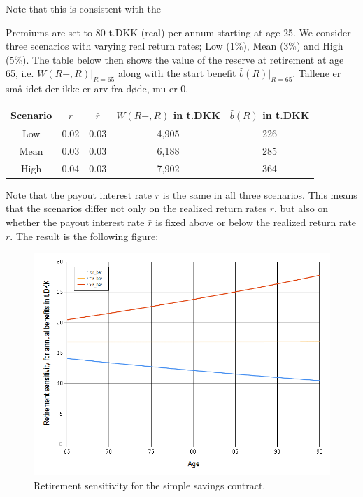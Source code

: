 \documentclass{article}
\newcommand{\1}[1]{\mathbbm{1}_{\left\lbrace #1 \right\rbrace}}
\theoremstyle{break}
\theoremstyle{remark}
\numberwithin{equation}{section}
\begin{document}
Note that this is consistent with the 

\begin{example}
Premiums are set to 80 t.DKK (real) per annum starting at age 25. We consider three scenarios with varying real return rates; Low (1\%), Mean (3\%) and High (5\%). The table below then shows the value of the reserve at retirement at age 65, i.e. $W(R-,R)|_{R=65}$ along with the start benefit $\hat{b}(R)|_{R=65}$. Tallene er små idet der ikke er arv fra døde, mu er 0.

\begin{center}
	\begin{tabular}{ |c|c|c|c|c| }
		\hline
		Scenario & $r$ & $\bar{r}$ & $W(R-,R)$ in t.DKK & $\hat{b}(R)$ in t.DKK \\
		\hline
		Low & 0.02 & 0.03 & 4,905 & 226 \\
		Mean & 0.03 & 0.03 & 6,188 & 285 \\
		High & 0.04 & 0.03 & 7,902 & 364 \\
		\hline
	\end{tabular}
\end{center}

Note that the payout interest rate $\bar{r}$ is the same in all three scenarios. This means that the scenarios differ not only on the realized return rates $r$, but also on whether the payout interest rate $\bar{r}$ is fixed above or below the realized return rate $r$. The result is the following figure:

\begin{figure}[H] \label{RSensiGraph}
	\centering
	\caption{Retirement sensitivity for the simple savings contract.}
	\includegraphics[width=\textwidth]{Rsensi}		
\end{figure}


\end{example}
\end{document}
